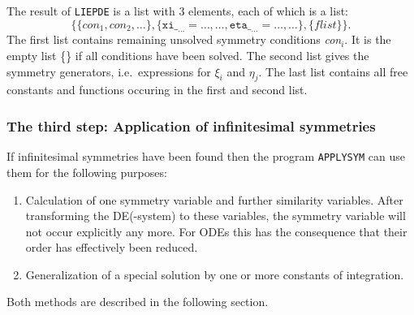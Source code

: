 The result of \texttt{LIEPDE} is a list with 3 elements, each of which
is a list:
\[ \{\{\textit{con}_1,\textit{con}_2,\ldots\},
     \{\texttt{xi}\__{\ldots}=\ldots, \ldots,
       \texttt{eta}\__{\ldots}=\ldots, \ldots\},
     \{\textit{flist}\}\}. \]
The first list contains remaining unsolved symmetry conditions \textit{con}$_i$. It
is the empty list \{\} if all conditions have been solved. The second list
gives the symmetry generators, i.e.\ expressions for $\xi_i$ and $\eta_j$. The
last list contains all free constants and functions occuring in the first
and second list.

%
%
\subsubsection{The third step: Application of infinitesimal symmetries}
If infinitesimal symmetries have been found then
the program \texttt{APPLYSYM} can use them for the following purposes:
\begin{enumerate}
\item Calculation of one symmetry variable and further similarity variables.
After transforming
the DE(-system) to these variables, the symmetry variable will not occur
explicitly any more. For ODEs this has the consequence that their order has
effectively been reduced.
\item Generalization of a special solution by one or more constants of
integration.
\end{enumerate}
Both methods are described in the following section.
